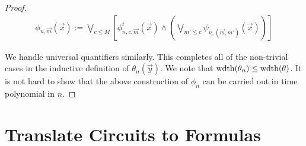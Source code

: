 \documentclass[../main/thesis.tex]{subfiles}
\begin{document}
\begin{proof}
  \begin{align*}
    \phi_{n, \vec{m}}(\vec{x}) := \bigvee_{c \leq M} [\phi^t_{n, c, \vec{m}}(\vec{x}) \land (\bigvee_{m' \leq c} \psi_{n, (\vec{m}, m')}(\vec{x}))]
  \end{align*}

  We handle universal quantifiers similarly. This completes all of the
  non-trivial cases in the inductive definition of $\theta_n(\vec{y})$. We note
  that $\mathrm{wdth}(\theta_n) \leq \mathrm{wdth}(\theta)$. It is not hard to show that the
  above construction of $\phi_n$ can be carried out in time polynomial in $n$.
  
\end{proof}

\section{Translate Circuits to Formulas}
\end{document}
